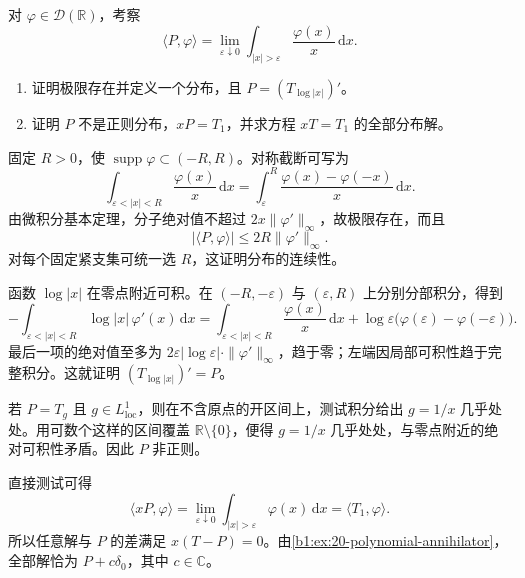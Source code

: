 \begin{optionalexercise}\label{b1:ex:20-principal-value-logarithm}
对 \(\varphi\in\mathcal D(\mathbb R)\)，考察
\[
 \langle P,\varphi\rangle
 =\lim_{\varepsilon\downarrow0}
 \int_{|x|>\varepsilon}\frac{\varphi(x)}x\,\mathrm dx.
\]
\begin{enumerate}
\item\label{b1:item:20-principal-value-existence}
证明极限存在并定义一个分布，且 \(P=(T_{\log|x|})'\)。
\item\label{b1:item:20-principal-value-nonregular}
证明 \(P\) 不是正则分布，\(xP=T_1\)，并求方程 \(xT=T_1\) 的全部分布解。
\end{enumerate}
\end{optionalexercise}
\begin{solution}
固定 \(R>0\)，使 \(\operatorname{supp}\varphi\subset(-R,R)\)。对称截断可写为
\[
 \int_{\varepsilon<|x|<R}\frac{\varphi(x)}x\,\mathrm dx
 =\int_\varepsilon^R\frac{\varphi(x)-\varphi(-x)}x\,\mathrm dx.
\]
由微积分基本定理，分子绝对值不超过 \(2x\|\varphi'\|_\infty\)，故极限存在，而且
\[
 |\langle P,\varphi\rangle|\le2R\|\varphi'\|_\infty.
\]
对每个固定紧支集可统一选 \(R\)，这证明分布的连续性。

函数 \(\log|x|\) 在零点附近可积。在 \((-R,-\varepsilon)\) 与 \((\varepsilon,R)\) 上分别分部积分，得到
\[
 -\int_{\varepsilon<|x|<R}\log|x|\,\varphi'(x)\,\mathrm dx
 =\int_{\varepsilon<|x|<R}\frac{\varphi(x)}x\,\mathrm dx
 +\log\varepsilon\bigl(\varphi(\varepsilon)-\varphi(-\varepsilon)\bigr).
\]
最后一项的绝对值至多为 \(2\varepsilon|\log\varepsilon|\cdot\|\varphi'\|_\infty\)，趋于零；左端因局部可积性趋于完整积分。这就证明 \((T_{\log|x|})'=P\)。

若 \(P=T_g\) 且 \(g\in L^1_{\mathrm{loc}}\)，则在不含原点的开区间上，测试积分给出 \(g=1/x\) 几乎处处。用可数个这样的区间覆盖 \(\mathbb R\setminus\{0\}\)，便得 \(g=1/x\) 几乎处处，与零点附近的绝对可积性矛盾。因此 \(P\) 非正则。

直接测试可得
\[
 \langle xP,\varphi\rangle
 =\lim_{\varepsilon\downarrow0}\int_{|x|>\varepsilon}\varphi(x)\,\mathrm dx
 =\langle T_1,\varphi\rangle.
\]
所以任意解与 \(P\) 的差满足 \(x(T-P)=0\)。由\cref{b1:ex:20-polynomial-annihilator}，全部解恰为 \(P+c\delta_0\)，其中 \(c\in\mathbb C\)。
\end{solution}

